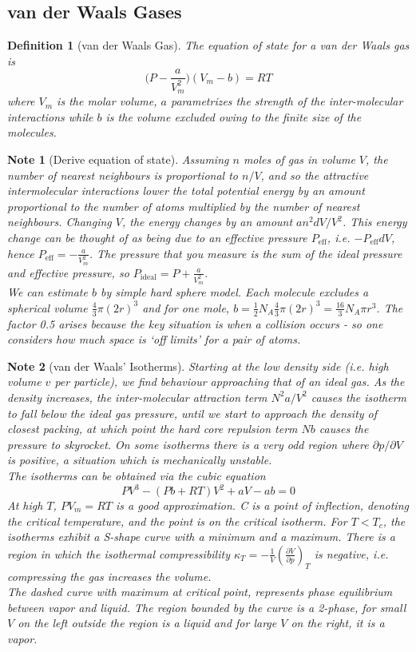 \documentclass[a4paper]{article}
\newtheorem{Note}{Note}[section]
\theoremstyle{new}
\newtheorem{defi}{Definition}[section]
\begin{document}
\subsection{van der Waals Gases}
\begin{defi}[van der Waals Gas]
The equation of state for a van der Waals gas is
$$\bigg(P-\frac{a}{V_m^2}\bigg)(V_m-b)=RT$$
where $V_m$ is the molar volume, $a$ parametrizes the strength of the inter-molecular interactions while $b$ is the volume excluded owing to the finite size of the molecules.
\end{defi}
\begin{Note}[Derive equation of state]
Assuming $n$ moles of gas in volume $V$, the number of nearest neighbours is proportional to $n/V$, and so the attractive intermolecular interactions lower the total potential energy by an amount proportional to the number of atoms multiplied by the number of nearest neighbours. Changing $V$, the energy changes by an amount $an^2dV/V^2$. This energy change can be thought of as being due to an effective pressure $P_{\text{eff}}$, i.e. $-P_{\text{eff}}dV$, hence $P_{\text{eff}}=-\frac{a}{V_m^2}$. The pressure that you measure is the sum of the ideal pressure and effective pressure, so $P_{\text{ideal}}=P+\frac{a}{V_m^2}$.\\[5pt]
We can estimate $b$ by simple hard sphere model. Each molecule excludes a spherical volume $\frac{4}{3}\pi(2r)^3$ and for one mole, $b=\frac{1}{2}N_A\frac{4}{3}\pi(2r)^3=\frac{16}{3}N_A\pi r^3$. The factor 0.5 arises because the key situation is when a collision occurs - so one considers how much space is `off limits' for a pair of atoms.
\end{Note}
\begin{Note}[van der Waals' Isotherms]
Starting at the low density side (i.e. high volume $v$ per particle), we find behaviour approaching that of an ideal gas. As the density increases, the inter-molecular attraction term $N^2a/V^2$ causes the isotherm to fall below the ideal gas pressure, until we start to approach the density of closest packing, at which point the hard core repulsion term $N b$ causes the pressure to skyrocket. On some isotherms there is a very odd region where $\partial p/\partial V$ is positive, a situation which is mechanically unstable.\\[5pt]
The isotherms can be obtained via the cubic equation
$$PV^3-(Pb+RT)V^2+aV-ab=0$$
At high $T$, $PV_m=RT$ is a good approximation. C is a point of inflection, denoting the critical temperature, and the point is on the critical isotherm. For $T<T_c$, the isotherms exhibit a S-shape curve with a minimum and a maximum. There is a region in which the isothermal compressibility $\kappa_T=-\frac{1}{V}(\frac{\partial V}{\partial p})_T$ is negative, i.e. compressing the gas increases the volume.\\[5pt]
The dashed curve with maximum at critical point, represents phase equilibrium between vapor and liquid. The region bounded by the curve is a 2-phase, for small $V$ on the left outside the region is a liquid and for large $V$ on the right, it is a vapor.
\end{Note}
\end{document}
